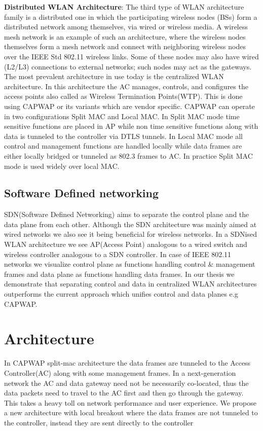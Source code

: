 \documentclass[12pt]{article}
\begin{document}
    \textbf{Distributed WLAN Architecture}: The third type of WLAN architecture family is a distributed one in which the participating wireless nodes (BSs) form a distributed network among themselves, via wired or wireless media. A wireless mesh network is an example of such an architecture, where the wireless nodes themselves form a mesh network and connect with neighboring wireless nodes over the IEEE Std 802.11 wireless links. Some of these nodes may also have wired (L2/L3) connections to external networks; such nodes may act as the gateways. \\
    

    
    The most prevalent architecture in use today is the centralized WLAN architecture. In this architecture the AC manages, controls, and configures the access points also called as Wireless Termination Points(WTP). This is done using CAPWAP\cite{RFC5416} or its variants which are vendor specific. CAPWAP can operate in two configurations Split MAC and Local MAC. In Split MAC mode time sensitive functions are placed in AP while non time sensitive functions along with data is tunneled to the controller via DTLS tunnels. In Local MAC mode all control and management functions are handled locally while data frames are either locally bridged or tunneled as 802.3 frames to AC. In practice Split MAC mode is used widely over local MAC. 


    \subsection{Software Defined networking}
    SDN(Software Defined Networking) aims to separate the control plane and the data plane from each other. Although the SDN architecture was mainly aimed at wired networks we also see it being beneficial for wireless networks. In a SDNised WLAN architecture we see AP(Access Point) analogous to a wired switch and wireless controller analogous to a SDN controller. In case of IEEE 802.11 networks we visualize control plane as functions handling control \& management frames and data plane as functions handling data frames. In our thesis we demonstrate that separating control and data in centralized WLAN architectures outperforms the current approach which unifies control and data planes e.g CAPWAP.
    
    
    
    \section{Architecture}
	  In CAPWAP split-mac architecture the data frames are tunneled to the Access Controller(AC) along with some management frames\cite{RFC5416}. In a next-generation network the AC and data gateway need not be necessarily co-located, thus the data packets need to travel to the AC first and then go through the gateway. This takes a heavy toll on network performance and user experience. We propose a new architecture with local breakout where the data frames are not tunneled to the controller, instead they are sent directly to the controller
    
    
    
    
   
     
     
    
    
    
  
\end{document}
